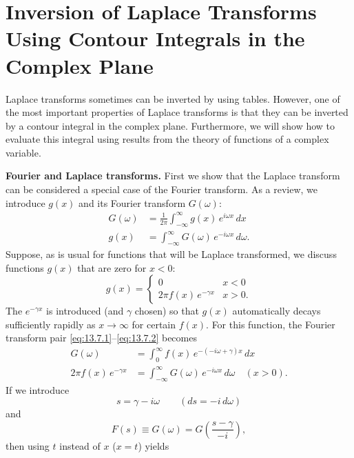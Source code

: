 \section{Inversion of Laplace Transforms Using Contour Integrals in the Complex Plane}
\label{sec:13.7}

Laplace transforms sometimes can be inverted by using tables.  However, one of the most important properties of Laplace transforms is that they can be inverted by a contour integral in the complex plane.  Furthermore, we will show how to evaluate this integral using results from the theory of functions of a complex variable.

\textbf{Fourier and Laplace transforms.}
First we show that the Laplace transform can be considered a special case of the Fourier transform.  As a review, we introduce $g(x)$ and its Fourier transform $G(\omega)$:
\begin{align}
G(\omega) &= \frac{1}{2\pi}\int_{-\infty}^{\infty} g(x)\,e^{i\omega x}\,dx \label{eq:13.7.1}\\
g(x) &= \int_{-\infty}^{\infty} G(\omega)\,e^{-i\omega x}\,d\omega. \label{eq:13.7.2}
\end{align}
Suppose, as is usual for functions that will be Laplace transformed, we discuss functions $g(x)$ that are zero for $x < 0$:
\begin{equation}
g(x) = \begin{cases} 0 & x < 0 \\ 2\pi f(x)\,e^{-\gamma x} & x > 0. \end{cases}
\label{eq:13.7.3}
\end{equation}
The $e^{-\gamma x}$ is introduced (and $\gamma$ chosen) so that $g(x)$ automatically decays sufficiently rapidly as $x \to \infty$ for certain $f(x)$.  For this function, the Fourier transform pair \eqref{eq:13.7.1}--\eqref{eq:13.7.2} becomes
\begin{align*}
G(\omega) &= \int_0^{\infty} f(x)\,e^{-(-i\omega+\gamma)x}\,dx \\
2\pi f(x)\,e^{-\gamma x} &= \int_{-\infty}^{\infty} G(\omega)\,e^{-i\omega x}\,d\omega
\quad (x > 0).
\end{align*}
If we introduce
\[
s = \gamma - i\omega \qquad (ds = -i\,d\omega)
\]
and
\begin{equation}
F(s) \equiv G(\omega) = G\!\left(\frac{s-\gamma}{-i}\right),
\label{eq:13.7.4}
\end{equation}
then using $t$ instead of $x$ ($x = t$) yields

